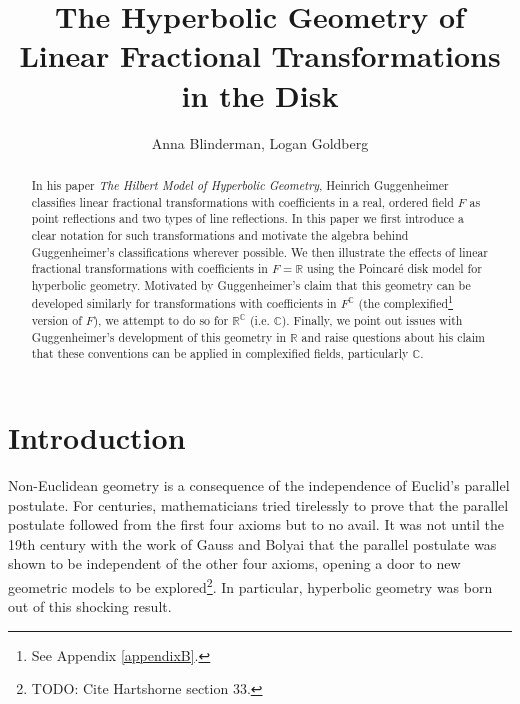 \documentclass[12pt]{article}
\title{The Hyperbolic Geometry of Linear Fractional Transformations in the \poincare Disk}
\author{Anna Blinderman, Logan Goldberg}
\date{}
\newcommand{\R}{\mathbb{R}}
\newcommand{\C}{\mathbb{C}}
\newcommand{\fc}{F^{\C}}
\newcommand{\poincare}{Poincar\'{e} }
\theoremstyle{plain}
\theoremstyle{definition}
\begin{document}
\maketitle






\begin{abstract}
In his paper \textit{The Hilbert Model of Hyperbolic Geometry}, Heinrich Guggenheimer classifies linear fractional transformations with coefficients in a real, ordered field $F$ as point reflections and two types of line reflections. In this paper we first introduce a clear notation for such transformations and motivate the algebra behind Guggenheimer's classifications wherever possible. We then illustrate the effects of linear fractional transformations with coefficients in $F = \R$ using the \poincare disk model for hyperbolic geometry. Motivated by Guggenheimer's claim that this geometry can be developed similarly for transformations with coefficients in $\fc$ (the complexified\footnote{See Appendix \ref{appendixB}.} version of $F$), we attempt to do so for $\R^{\C}$ (i.e. $\C$). Finally, we point out issues with Guggenheimer's development of this geometry in $\R$ and raise questions about his claim that these conventions can be applied in complexified fields, particularly $\C$.
\end{abstract}






\section{Introduction}

\hspace{10mm} Non-Euclidean geometry is a consequence of the independence of Euclid's parallel postulate. For centuries, mathematicians tried tirelessly to prove that the parallel postulate followed from the first four axioms but to no avail. It was not until the 19th century with the work of Gauss and Bolyai that the parallel postulate was shown to be independent of the other four axioms, opening a door to new geometric models to be explored\footnote{TODO: Cite Hartshorne section 33.}. In particular, hyperbolic geometry was born out of this shocking result. 
\end{document}
